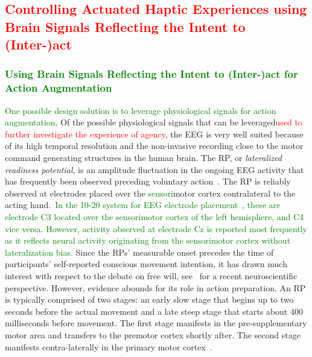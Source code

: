 \textcolor{red}{\subsection{Controlling Actuated Haptic Experiences using Brain Signals Reflecting the Intent to (Inter-)act}}

\subsubsection{\textcolor{green}{Using Brain Signals Reflecting the Intent to (Inter-)act for Action Augmentation}}
\textcolor{green}{One possible design solution is to leverage physiological signals for action augmentation}. Of the possible physiological signals that can be leveraged\textcolor{red}{used to further investigate the experience of agency}, the EEG is very well suited because of its high temporal resolution and the non-invasive recording close to the motor command generating structures in the human brain. The RP, or \textit{lateralized readiness potential}, is an amplitude fluctuation in the ongoing EEG activity that has frequently been observed preceding voluntary action~\cite{Deecke1969-bl, Libet1983-qu}. The RP is reliably observed at electrodes placed over the \textcolor{green}{sensori}motor cortex contralateral to the acting hand.~\textcolor{green}{In the 10-20 system for EEG electrode placement~\cite{Jasper1983-uw}, these are electrode C3 located over the sensorimotor cortex of the left hemisphere, and C4 vice versa. However, activity observed at electrode Cz is reported most frequently as it reflects neural activity originating from the sensorimotor cortex without lateralization bias.} Since the RPs' measurable onset precedes the time of participants' self-reported conscious movement intention, it has drawn much interest with respect to the debate on free will, see~\cite{Schurger2021-vp} for a recent neuroscientific perspective. However, evidence abounds for its role in action preparation. An RP is typically comprised of two stages: an early slow stage that begins up to two seconds before the actual movement and a late steep stage that starts about 400 milliseconds before movement. The first stage manifests in the pre-supplementary motor area and transfers to the premotor cortex shortly after. The second stage manifests contra-laterally in the primary motor cortex~\cite{Shibasaki2006-mt}. 

